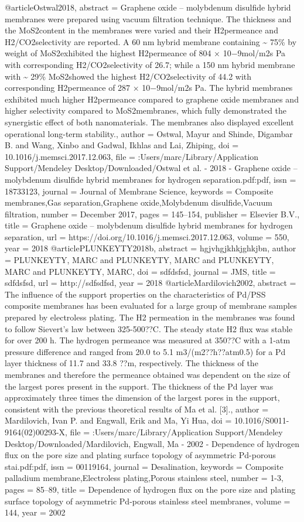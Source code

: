 @article{Ostwal2018,
abstract = {Graphene oxide – molybdenum disulfide hybrid membranes were prepared using vacuum filtration technique. The thickness and the MoS2content in the membranes were varied and their H2permeance and H2/CO2selectivity are reported. A 60 nm hybrid membrane containing {\~{}} 75{\%} by weight of MoS2exhibited the highest H2permeance of 804 × 10−9mol/m2s Pa with corresponding H2/CO2selectivity of 26.7; while a 150 nm hybrid membrane with {\~{}} 29{\%} MoS2showed the highest H2/CO2selectivity of 44.2 with corresponding H2permeance of 287 × 10−9mol/m2s Pa. The hybrid membranes exhibited much higher H2permeance compared to graphene oxide membranes and higher selectivity compared to MoS2membranes, which fully demonstrated the synergistic effect of both nanomaterials. The membranes also displayed excellent operational long-term stability.},
author = {Ostwal, Mayur and Shinde, Digambar B. and Wang, Xinbo and Gadwal, Ikhlas and Lai, Zhiping},
doi = {10.1016/j.memsci.2017.12.063},
file = {:Users/marc/Library/Application Support/Mendeley Desktop/Downloaded/Ostwal et al. - 2018 - Graphene oxide – molybdenum disulfide hybrid membranes for hydrogen separation.pdf:pdf},
issn = {18733123},
journal = {Journal of Membrane Science},
keywords = {Composite membranes,Gas separation,Graphene oxide,Molybdenum disulfide,Vacuum filtration},
number = {December 2017},
pages = {145--154},
publisher = {Elsevier B.V.},
title = {{Graphene oxide – molybdenum disulfide hybrid membranes for hydrogen separation}},
url = {https://doi.org/10.1016/j.memsci.2017.12.063},
volume = {550},
year = {2018}
}
@article{PLUNKEYTY2018b,
abstract = {hgjvhgjkhkjghkjbn},
author = {PLUNKEYTY, MARC and PLUNKEYTY, MARC and PLUNKEYTY, MARC and PLUNKEYTY, MARC},
doi = {sdfdsfsd},
journal = {JMS},
title = {sdfdsfsd},
url = {http://sdfsdfsd},
year = {2018}
}
@article{Mardilovich2002,
abstract = {The influence of the support properties on the characteristics of Pd/PSS composite membranes has been evaluated for a large group of membrane samples prepared by electroless plating. The H2 permeation in the membranes was found to follow Sievert's law between 325-500??C. The steady state H2 flux was stable for over 200 h. The hydrogen permeance was measured at 350??C with a 1-atm pressure difference and ranged from 20.0 to 5.1 m3/(m2??h??atm0.5) for a Pd layer thickness of 11.7 and 33.8 ??m, respectively. The thickness of the membranes and therefore the permeance obtained was dependent on the size of the largest pores present in the support. The thickness of the Pd layer was approximately three times the dimension of the largest pores in the support, consistent with the previous theoretical results of Ma et al. [3].},
author = {Mardilovich, Ivan P. and Engwall, Erik and Ma, Yi Hua},
doi = {10.1016/S0011-9164(02)00293-X},
file = {:Users/marc/Library/Application Support/Mendeley Desktop/Downloaded/Mardilovich, Engwall, Ma - 2002 - Dependence of hydrogen flux on the pore size and plating surface topology of asymmetric Pd-porous stai.pdf:pdf},
issn = {00119164},
journal = {Desalination},
keywords = {Composite palladium membrane,Electroless plating,Porous stainless steel},
number = {1-3},
pages = {85--89},
title = {{Dependence of hydrogen flux on the pore size and plating surface topology of asymmetric Pd-porous stainless steel membranes}},
volume = {144},
year = {2002}
}
